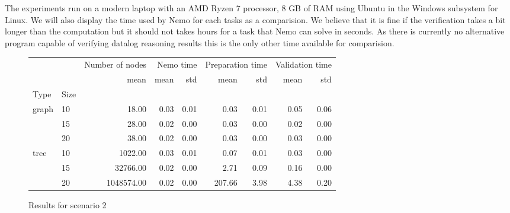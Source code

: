 The experiments run on a modern laptop with an AMD Ryzen 7 processor, 8 GB of RAM using Ubuntu in the Windows subsystem for Linux. We will also display the time used by Nemo for each tasks as a comparision. We believe that it is fine if the verification takes a bit longer than the computation but it should not takes hours for a task that Nemo can solve in seconds. As there is currently no alternative program capable of verifying datalog reasoning results this is the only other time available for comparision.

\begin{figure}
\begin{tabular}{llrrrrrrr}
    &  & Number of nodes & \multicolumn{2}{r}{Nemo time} & \multicolumn{2}{r}{Preparation time} & \multicolumn{2}{r}{Validation time} \\
    &  & mean & mean & std & mean & std & mean & std \\
   Type & Size &  &  &  &  &  &  &  \\
   \multirow[c]{3}{*}{graph} & 10 & 18.00 & 0.03 & 0.01 & 0.03 & 0.01 & 0.05 & 0.06 \\
    & 15 & 28.00 & 0.02 & 0.00 & 0.03 & 0.00 & 0.02 & 0.00 \\
    & 20 & 38.00 & 0.02 & 0.00 & 0.03 & 0.00 & 0.03 & 0.00 \\
   \multirow[c]{3}{*}{tree} & 10 & 1022.00 & 0.03 & 0.01 & 0.07 & 0.01 & 0.03 & 0.00 \\
    & 15 & 32766.00 & 0.02 & 0.00 & 2.71 & 0.09 & 0.16 & 0.00 \\
    & 20 & 1048574.00 & 0.02 & 0.00 & 207.66 & 3.98 & 4.38 & 0.20 \\
\end{tabular}
\caption{Results for scenario 2}
\end{figure}

